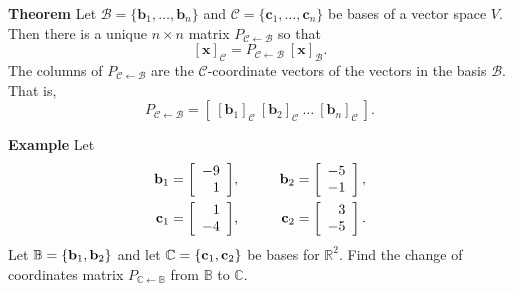  \begin{frame}[fragile]
\textbf{Theorem}
Let ${\mathcal B} = \{ \textbf{b}_1, \dots , \textbf{b}_n \}$
and ${\mathcal C} = \{ \textbf{c}_1, \dots , \textbf{c}_n \}$ be bases of a 
vector space $V$.  Then there is a unique $n \times n$ matrix 
$P_{{\mathcal C} \leftarrow {\mathcal B} }$ 
so that 
\[
[ \textbf{x}]_{\mathcal C} =
P_{{\mathcal C} \leftarrow {\mathcal B} }
\  [\textbf{x}]_{\mathcal B}.
\]
The columns of 
$P_{{\mathcal C} \leftarrow {\mathcal B} }$ 
are the ${\mathcal C}$-coordinate vectors of the vectors in the basis $\mathcal B$.
That is,
\[
P_{{\mathcal C} \leftarrow {\mathcal B} }
= \left[ \ [\textbf{b}_1]_{\mathcal C}\ [\textbf{b}_2]_{\mathcal C}\ 
\dots \ [\textbf{b}_n]_{\mathcal C}   \  \right].
\]



%
%

\end{frame}





 \begin{frame}[fragile]
\textbf{Example}
Let 
\begin{eqnarray*}
\textbf b _1 = \left[\begin{array}{r} -9 \\ 1\end{array}\right] &,& \qquad \textbf b_2 =\left[ \begin{array}{r} -5 \\ -1\end{array}\right], \\
\textbf c_1 = \left[\begin{array}{r} 1 \\ -4\end{array}\right]  &,& \qquad \textbf c_2 = \left[\begin{array}{r} 3 \\ -5\end{array}\right].
\end{eqnarray*}
Let $\mathbb B=\{\textbf b_1,\textbf b_2\}$ and let $\mathbb C=\{\textbf c_1,\textbf c_2\}$ be bases for $\mathbb R^2$.
Find the change of coordinates matrix $P_{\mathbb C\leftarrow\mathbb B}$ from $\mathbb B$ to $\mathbb C$.

\end{frame}





